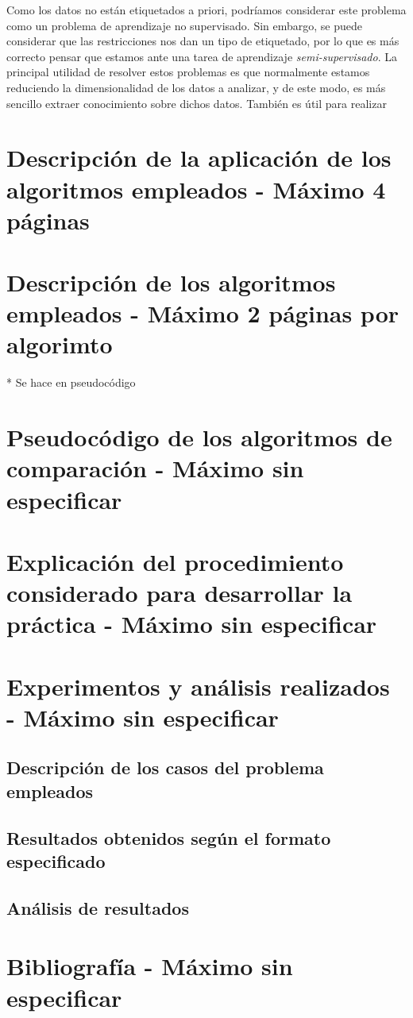 \documentclass[11pt]{article}
\begin{document}
Como los datos no están etiquetados a priori, podríamos considerar este problema como un problema de aprendizaje no supervisado. Sin embargo, se puede considerar que las restricciones nos dan un tipo de etiquetado, por lo que es más correcto pensar que estamos ante una tarea de aprendizaje \emph{semi-supervisado}. La principal utilidad de resolver estos problemas es que normalmente estamos reduciendo la dimensionalidad de los datos a analizar, y de este modo, es más sencillo extraer conocimiento sobre dichos datos. También es útil para realizar

\pagebreak

\section{Descripción de la aplicación de los algoritmos empleados - Máximo 4 páginas}

\section{Descripción de los algoritmos empleados - Máximo 2 páginas por algorimto}

* Se hace en pseudocódigo

\section{Pseudocódigo de los algoritmos de comparación - Máximo sin especificar}

\section{Explicación del procedimiento considerado para desarrollar la práctica - Máximo sin especificar}

\section{Experimentos y análisis realizados - Máximo sin especificar}

\subsection{Descripción de los casos del problema empleados}

\subsection{Resultados obtenidos según el formato especificado}

\subsection{Análisis de resultados}

\section{Bibliografía - Máximo sin especificar}
\end{document}
